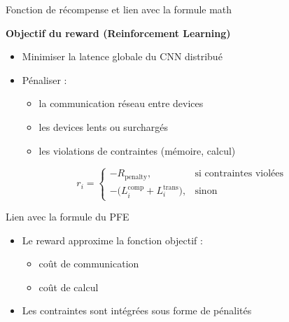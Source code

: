 \documentclass[aspectratio=169]{beamer}
\begin{document}
\begin{frame}{Fonction de récompense et lien avec la formule math}

\textbf{Objectif du reward (Reinforcement Learning)}
\begin{itemize}
    \item Minimiser la latence globale du CNN distribué
    \item Pénaliser :
    \begin{itemize}
        \item la communication réseau entre devices
        \item les devices lents ou surchargés
        \item les violations de contraintes (mémoire, calcul)
    \end{itemize}
\end{itemize}

\[
r_i =
\begin{cases}
- R_{\text{penalty}}, & \text{si contraintes violées} \\
- \big( L_i^{\text{comp}} + L_i^{\text{trans}} \big), & \text{sinon}
\end{cases}
\]


\begin{block}{Lien avec la formule du PFE}
\begin{itemize}
    \item Le reward approxime la fonction objectif :
    \begin{itemize}
        \item coût de communication
        \item coût de calcul
    \end{itemize}
    \item Les contraintes sont intégrées sous forme de pénalités
\end{itemize}
\end{block}

\end{frame}
\end{document}
